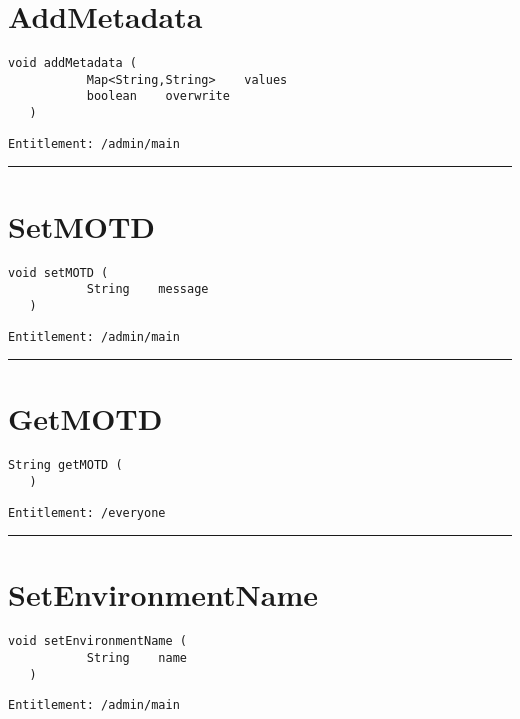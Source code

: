 \section{AddMetadata}
\label{Api:AddMetadata}
\begin{lstlisting}[style=nonumbers]
   void addMetadata (
           Map<String,String>    values
           boolean    overwrite
   )
\end{lstlisting}
\begin{Verbatim}[formatcom=\color{Maroon}]
  Entitlement: /admin/main
\end{Verbatim}



\rule{12cm}{2pt}
\section{SetMOTD}
\label{Api:SetMOTD}
\begin{lstlisting}[style=nonumbers]
   void setMOTD (
           String    message
   )
\end{lstlisting}
\begin{Verbatim}[formatcom=\color{Maroon}]
  Entitlement: /admin/main
\end{Verbatim}



\rule{12cm}{2pt}
\section{GetMOTD}
\label{Api:GetMOTD}
\begin{lstlisting}[style=nonumbers]
   String getMOTD (
   )
\end{lstlisting}
\begin{Verbatim}[formatcom=\color{Maroon}]
  Entitlement: /everyone
\end{Verbatim}



\rule{12cm}{2pt}
\section{SetEnvironmentName}
\label{Api:SetEnvironmentName}
\begin{lstlisting}[style=nonumbers]
   void setEnvironmentName (
           String    name
   )
\end{lstlisting}
\begin{Verbatim}[formatcom=\color{Maroon}]
  Entitlement: /admin/main
\end{Verbatim}



